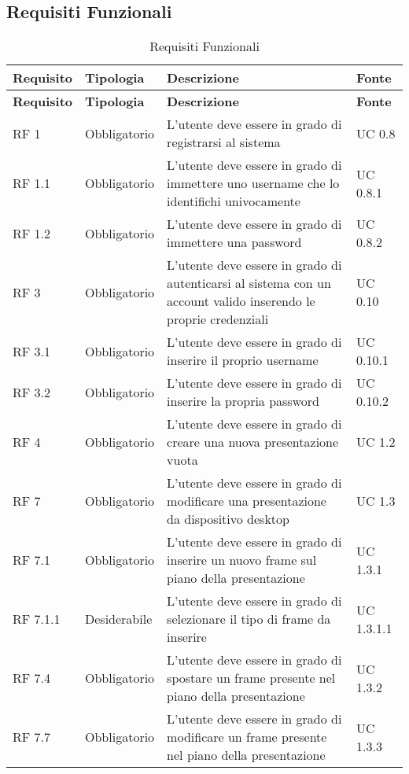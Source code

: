 \subsection{Requisiti Funzionali}{ 
\renewcommand*{\arraystretch}{1.4} 
\begin{longtable} [c]{| p{2.5cm} | p{2.5cm} | p{6cm} |p{2.5cm}|} 
\caption{Requisiti Funzionali \label{tab:reqFunzionali}}\\ \hline\textbf{Requisito} & \textbf{Tipologia} & \textbf{Descrizione} & \textbf{Fonte} \\ 
\hline \endfirsthead \hline 
\textbf{Requisito} & \textbf{Tipologia} & \textbf{Descrizione} & \textbf{Fonte} \\ 
\hline \endhead \hline \endfoot \hline \endlastfoot 
RF 1 & Obbligatorio & L’utente deve essere in grado di registrarsi al sistema & UC 0.8\\ 
 \hline 
RF 1.1 & Obbligatorio & L’utente deve essere in grado di immettere uno username che lo identifichi univocamente & UC 0.8.1\\ 
 \hline 
RF 1.2 & Obbligatorio & L'utente deve essere in grado di immettere una password & UC 0.8.2\\ 
 \hline 
RF 3 & Obbligatorio & L’utente deve essere in grado di autenticarsi al sistema con un account valido inserendo le proprie credenziali & UC 0.10\\ 
 \hline 
RF 3.1 & Obbligatorio & L'utente deve essere in grado di inserire il proprio username & UC 0.10.1\\ 
 \hline 
RF 3.2 & Obbligatorio & L'utente deve essere in grado di inserire la propria password & UC 0.10.2\\ 
 \hline 
RF 4 & Obbligatorio & L’utente deve essere in grado di creare una nuova presentazione vuota & UC 1.2\\ 
 \hline 
RF 7 & Obbligatorio & L'utente deve essere in grado di modificare una presentazione da dispositivo desktop & UC 1.3\\ 
 \hline 
RF 7.1 & Obbligatorio & L'utente deve essere in grado di inserire un nuovo frame sul piano della presentazione & UC 1.3.1\\ 
 \hline 
RF 7.1.1 & Desiderabile & L'utente deve essere in grado di selezionare il tipo di frame da inserire & UC 1.3.1.1\\ 
 \hline 
RF 7.4 & Obbligatorio & L'utente deve essere in grado di spostare un frame presente nel piano della presentazione & UC 1.3.2\\ 
 \hline 
RF 7.7 & Obbligatorio & L'utente deve essere in grado di modificare un frame presente nel piano della presentazione & UC 1.3.3\\ 

\end{longtable}}
